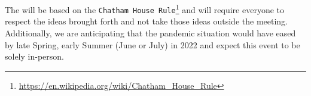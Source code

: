 \documentclass[10pt,letterpaper]{article}
\begin{document}
The \symp will be based on the \texttt{Chatham House
  Rule}\footnote{\url{https://en.wikipedia.org/wiki/Chatham_House_Rule}}
and will require everyone to respect the ideas brought forth and not
take those ideas outside the meeting. Additionally, we are
anticipating that the pandemic situation would have eased by late
Spring, early Summer (June or July) in 2022 and expect this event to
be solely in-person.

\renewcommand{\thepage}{}
\end{document}
